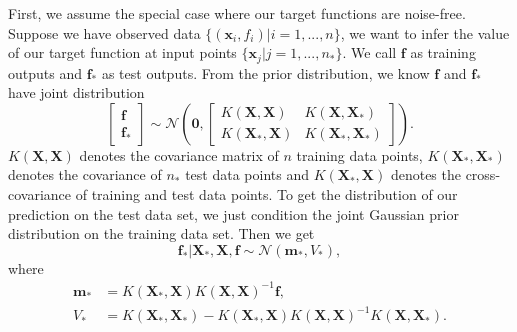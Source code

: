 \documentclass[11pt,a4paper]{article}
\theoremstyle{definition}
\numberwithin{equation}{section}
\let\vec\mathbf
\begin{document}
	First, we assume the special case where our target functions are noise-free. Suppose we have observed data $\{(\vec x_i,f_i)|i=1,...,n\}$, we want to infer the value of our target function at input points $\{\vec x_j | j = 1,...,n_*\}$. We call $\vec f$ as training outputs and $\vec f_*$ as test outputs. From the prior distribution, we know 
	$\vec f$ and $\vec f_*$ have joint distribution
	\begin{equation} \label{}
	\begin{bmatrix}
	\vec f\\
	\vec f_*
	\end{bmatrix}
	\sim
	\mathcal{N}\left(\vec 0, 
	\begin{bmatrix}
	K(\vec X,\vec X) & K(\vec X,\vec X_*)\\
	K(\vec X_*,\vec X) & K(\vec X_*,\vec X_*)
	\end{bmatrix}
	\right).
	\end{equation}
	$K(\vec X,\vec X)$ denotes the covariance matrix of $n$ training data points, $K(\vec X_*,\vec X_*)$ denotes the covariance of $n_*$ test data points and $K(\vec X_*,\vec X)$ denotes the cross-covariance of training and test data points. To get the distribution of our prediction on the test data set, we just condition the joint Gaussian prior distribution on the training data set. Then we get
	\begin{equation} \label{eq:pred1}
	\vec f_* | \vec X_*, \vec X, \vec f \sim \mathcal N (\vec m_*, V_*),
	\end{equation}
	where
	\begin{equation} \label{eq:pred2}
	\begin{split}
	\vec m_* &= K(\vec X_*,\vec X)K(\vec X,\vec X)^{-1}\vec f,\\
	V_* &= K(\vec X_*,\vec X_*) - K(\vec X_*,\vec X)K(\vec X,\vec X)^{-1}K(\vec X,\vec X_*).
	\end{split}
	\end{equation}
	
\end{document}
